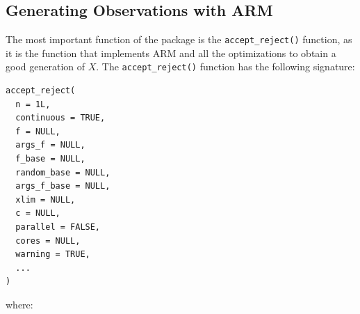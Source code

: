 \subsection{Generating Observations with ARM}\label{generating-observations-with-arm}

The most important function of the  package is the \texttt{accept\_reject()} function, as it is the function that implements ARM and all the optimizations to obtain a good generation of \(X\). The \texttt{accept\_reject()} function has the following signature:

\begin{verbatim}
accept_reject(
  n = 1L,
  continuous = TRUE,
  f = NULL,
  args_f = NULL,
  f_base = NULL,
  random_base = NULL,
  args_f_base = NULL,
  xlim = NULL,
  c = NULL,
  parallel = FALSE,
  cores = NULL,
  warning = TRUE,
  ...
)
\end{verbatim}

where:

